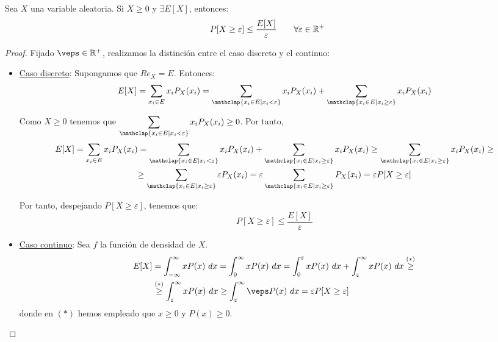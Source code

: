 \begin{teo}
    Sea $X$ una variable aleatoria. Si $X\geq 0$ y $\exists E[X]$, entonces:
    \begin{equation*}
        P[X\geq \varepsilon]\leq \dfrac{E[X]}{\varepsilon} \qquad \forall \varepsilon\in \mathbb{R}^+
    \end{equation*}
\end{teo}
\begin{proof}
    Fijado $\veps\in \bb{R}^+$, realizamos la distinción entre el caso discreto y el continuo:
    \begin{itemize}
        \item \underline{Caso discreto}: Supongamos que $Re_X=E$. Entonces:
        \begin{equation*}
            E[X]=\sum_{x_i\in E}x_iP_X(x_i)
            = \sum_{\mathclap{x_i\in E\mid x_i<\varepsilon}}x_iP_X(x_i) + \sum_{\mathclap{x_i\in E\mid x_i\geq \varepsilon}}x_iP_X(x_i)
        \end{equation*}

        Como $X\geq 0$ tenemos que $\displaystyle \sum\limits_{\mathclap{x_i\in E\mid x_i<\varepsilon}}x_iP_X(x_i)\geq 0$. Por tanto,
        \begin{multline*}
            E[X]
            =\sum_{x_i\in E}x_iP_X(x_i)
            = \sum_{\mathclap{x_i\in E\mid x_i<\varepsilon}}x_iP_X(x_i) + \sum_{\mathclap{x_i\in E\mid x_i\geq \varepsilon}}x_iP_X(x_i)
            \geq \sum_{\mathclap{x_i\in E\mid x_i\geq \varepsilon}}x_iP_X(x_i)
            \geq\\
            \geq \sum_{\mathclap{x_i\in E\mid x_i\geq \varepsilon}}\varepsilon P_X(x_i)
            = \varepsilon \sum_{\mathclap{x_i\in E\mid x_i\geq \varepsilon}} P_X(x_i)
            = \varepsilon P[X\geq \varepsilon]
        \end{multline*}

        Por tanto, despejando $P[X\geq \varepsilon]$, tenemos que:
        \begin{equation*}
            P[X\geq \varepsilon] \leq \frac{E[X]}{\varepsilon}
        \end{equation*}

        \item \underline{Caso continuo}: Sea $f$ la función de densidad de $X$.
        \begin{align*}
            E[X]
            &= \int_{-\infty}^\infty xP(x)~dx
            = \int_0^\infty xP(x)~dx
            =\int_0^\varepsilon xP(x)~dx + \int_\varepsilon^\infty xP(x)~dx
            \stackrel{(\ast)}{\geq} \\&\stackrel{(\ast)}{\geq} \int_\varepsilon^\infty xP(x)~dx
            \geq \int_\varepsilon^\infty \veps P(x)~dx            
            = \varepsilon P[X\geq \varepsilon]
        \end{align*}
        donde en $(\ast)$ hemos empleado que $x\geq 0$ y $P(x)\geq 0$.


\end{itemize}
\end{proof}
